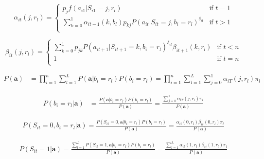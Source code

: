 \documentclass{article}
\begin{document}
\begin{equation} \label{fwd}
\alpha_{it}(j,r_l) = \begin{cases}
    p_{j} f(a_{i1}|S_{i1}=j,r_l) & \text{if } t = 1 \\
    \sum_{k=0}^1 \alpha_{it-1} (k,b_l)p_{kj}P(a_{it}|S_{it}=j,b_i=r_l)^{\delta_{it}} 
        & \text{if } t > 1\\
\end{cases}
\end{equation}

\begin{equation} \label{bkwd}
\beta_{it}(j,r_l) = \begin{cases} 
    \sum_{k=0}^1p_{jk}P(a_{it+1}|S_{it+1}=k,b_i=r_l)^{\delta_{it}}\beta_{it+1}(k,r_l) 
        & \text{if } t < n \\
    1 & \text{if } t = n \\
\end{cases}
\end{equation}


\begin{equation}\label{proba}
\begin{split}
    P(\textbf{a}) & = \prod_{i=1}^n \sum_{l=1}^L 
        P(\textbf{a}|b_{i}=r_l)P(b_{i}=r_l) = 
    \prod_{i=1}^n \sum_{l=1}^L \sum_{j=0}^1 \alpha_{iT}(j,r_l)\pi_l 
\end{split}
\end{equation}

\begin{equation}\label{probl}
\begin{split}
    P(b_{i}=r_l|\textbf{a}) & = \frac{P(\textbf{a}|b_{i}=r_l)P(b_{i}=r_l)}{P(\textbf{a})} = 
    \frac{\sum_{j=0}^1 \alpha_{iT}(j,r_l)\pi_l }{P(\textbf{a})}  
\end{split}
\end{equation}

\begin{equation}\label{probs0}
\begin{split}
    P(S_{it}=0,b_{i}=r_l|\textbf{a}) = \frac{P(S_{it}=0,\textbf{a}|b_{i}=r_l)
        P(b_{i}=r_l)}{P(\textbf{a})} = 
    \frac{\alpha_{it}(0,r_l)\beta_{it}(0,r_l)\pi_l }{P(\textbf{a})} 
\end{split}
\end{equation}

\begin{equation}\label{probs1}
\begin{split}
    P(S_{it}=1|\textbf{a}) = 
    \frac{\sum^L_{l=1}P(S_{it}=1,\textbf{a}|b_{i}=r_l)
        P(b_{i}=r_l)}{P(\textbf{a})} = 
    \frac{\sum^L_{l=1}\alpha_{it}(1,r_l)\beta_{it}(1,r_l)\pi_l }{P(\textbf{a})} 
\end{split}
\end{equation}
\end{document}
